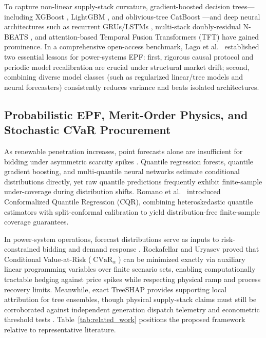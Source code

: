 \documentclass[runningheads,a4paper]{llncs}
\begin{document}
To capture non-linear supply-stack curvature, gradient-boosted decision trees---including XGBoost \cite{chen2016xgboost}, LightGBM \cite{ke2017lightgbm}, and oblivious-tree CatBoost \cite{prokhorenkova2018catboost}---and deep neural architectures such as recurrent GRUs/LSTMs \cite{ugurlu2018electricity}, multi-stack doubly-residual N-BEATS \cite{oreshkin2020nbeats}, and attention-based Temporal Fusion Transformers (TFT) \cite{lim2021temporal} have gained prominence. In a comprehensive open-access benchmark, Lago et al.~\cite{lago2021forecasting} established two essential lessons for power-systems EPF: first, rigorous causal protocol and periodic model recalibration are crucial under structural market drift; second, combining diverse model classes (such as regularized linear/tree models and neural forecasters) consistently reduces variance and beats isolated architectures.

\subsection{Probabilistic EPF, Merit-Order Physics, and Stochastic CVaR Procurement}
As renewable penetration increases, point forecasts alone are insufficient for bidding under asymmetric scarcity spikes \cite{nowotarski2018recent}. Quantile regression forests, quantile gradient boosting, and multi-quantile neural networks estimate conditional distributions directly, yet raw quantile predictions frequently exhibit finite-sample under-coverage during distribution shifts. Romano et al.~\cite{romano2019conformalized} introduced Conformalized Quantile Regression (CQR), combining heteroskedastic quantile estimators with split-conformal calibration to yield distribution-free finite-sample coverage guarantees.

In power-system operations, forecast distributions serve as inputs to risk-constrained bidding and demand response \cite{conejo2010decision}. Rockafellar and Uryasev \cite{rockafellar2000optimization} proved that Conditional Value-at-Risk ($\operatorname{CVaR}_{\alpha}$) can be minimized exactly via auxiliary linear programming variables over finite scenario sets, enabling computationally tractable hedging against price spikes while respecting physical ramp and process recovery limits. Meanwhile, exact TreeSHAP \cite{lundberg2020local} provides supporting local attribution for tree ensembles, though physical supply-stack claims must still be corroborated against independent generation dispatch telemetry and econometric threshold tests \cite{hansen2000sample}. Table~\ref{tab:related_work} positions the proposed framework relative to representative literature.
\end{document}
